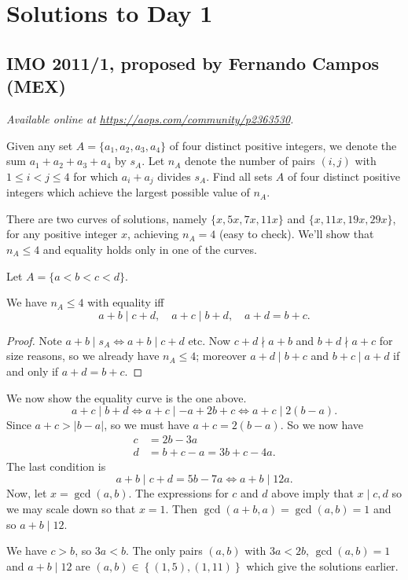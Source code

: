 \documentclass[11pt]{scrartcl}
\begin{document}
\section{Solutions to Day 1}
\subsection{IMO 2011/1, proposed by Fernando Campos (MEX)}
\textsl{Available online at \url{https://aops.com/community/p2363530}.}
\begin{mdframed}[style=mdpurplebox,frametitle={Problem statement}]
Given any set $A = \{a_1, a_2, a_3, a_4\}$ of four distinct
positive integers, we denote the sum $a_1+a_2+a_3+a_4$ by $s_A$.
Let $n_A$ denote the number of pairs $(i,j)$ with $1 \le i < j \le 4$
for which $a_i + a_j$ divides $s_A$.
Find all sets $A$ of four distinct positive integers which achieve
the largest possible value of $n_A$.
\end{mdframed}
There are two curves of solutions,
namely $\{x,5x,7x,11x\}$ and $\{x,11x,19x,29x\}$,
for any positive integer $x$,
achieving $n_A = 4$ (easy to check).
We'll show that $n_A \le 4$
and equality holds only in one of the curves.

Let $A = \{a < b < c < d\}$.
\begin{claim*}
  We have $n_A \le 4$ with equality iff
  \[ a+b \mid c+d, \quad a+c \mid b+d, \quad a+d = b+c. \]
\end{claim*}
\begin{proof}
Note $a+b \mid s_A \iff a+b \mid c+d$ etc.
Now $c+d \nmid a+b$ and $b+d \nmid a+c$ for size reasons,
so we already have $n_A \le 4$;
moreover $a+d \mid b+c$ and $b+c \mid a+d$
if and only if $a+d = b+c$.
\end{proof}

We now show the equality curve is the one above.
\[ a+c  \mid b+d \iff a+c \mid -a+2b+c \iff a+c \mid 2(b-a). \]
Since $a+c > |b-a|$, so we must have $a+c=2(b-a)$.
So we now have
\begin{align*}
  c &= 2b-3a \\
  d &= b+c-a = 3b+c-4a.
\end{align*}
The last condition is
\[ a+b \mid c+d = 5b-7a \iff a+b \mid 12a. \]
Now, let $x = \gcd(a,b)$.
The expressions for $c$ and $d$ above imply that
$x \mid c,d$ so we may scale down so that $x = 1$.
Then $\gcd(a+b,a) = \gcd(a,b) = 1$ and so $a+b \mid 12$.

We have $c > b$, so $3a < b$.
The only pairs $(a,b)$ with $3a < 2b$, $\gcd(a,b) = 1$
and $a+b \mid 12$
are $(a,b) \in \left\{ (1,5), (1,11) \right\}$
which give the solutions earlier.
\pagebreak
\end{document}
